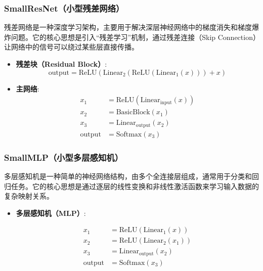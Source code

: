 \documentclass[10pt,a4paper,twoside]{article}
\numberwithin{figure}{section}%
\numberwithin{table}{section}%
\begin{document}
\subsubsection{SmallResNet（小型残差网络）}
残差网络是一种深度学习架构，主要用于解决深层神经网络中的梯度消失和梯度爆炸问题。它的核心思想是引入“残差学习”机制，通过残差连接（Skip Connection）让网络中的信号可以绕过某些层直接传播。
\begin{itemize}
\item \textbf{残差块（Residual Block）}:
\[
\text{output} = \text{ReLU}(\text{Linear}_2(\text{ReLU}(\text{Linear}_1(x))) + x)
\]

\item \textbf{主网络}:
\[
\begin{aligned}
x_1 &= \text{ReLU}(\text{Linear}_{\text{input}}(x)) \\
x_2 &= \text{BasicBlock}(x_1) \\
x_3 &= \text{Linear}_{\text{output}}(x_2) \\
\text{output} &= \text{Softmax}(x_3)
\end{aligned}
\]

\end{itemize}
\subsubsection{SmallMLP（小型多层感知机）}
多层感知机是一种简单的神经网络结构，由多个全连接层组成，通常用于分类和回归任务。它的核心思想是通过逐层的线性变换和非线性激活函数来学习输入数据的复杂映射关系。

\begin{itemize}
\item \textbf{多层感知机（MLP）}:

\[
\begin{aligned}
x_1 &= \text{ReLU}(\text{Linear}_1(x)) \\
x_2 &= \text{ReLU}(\text{Linear}_2(x_1)) \\
x_3 &= \text{Linear}_{\text{output}}(x_2) \\
\text{output} &= \text{Softmax}(x_3)
\end{aligned}
\]

\end{itemize}
\end{document}
